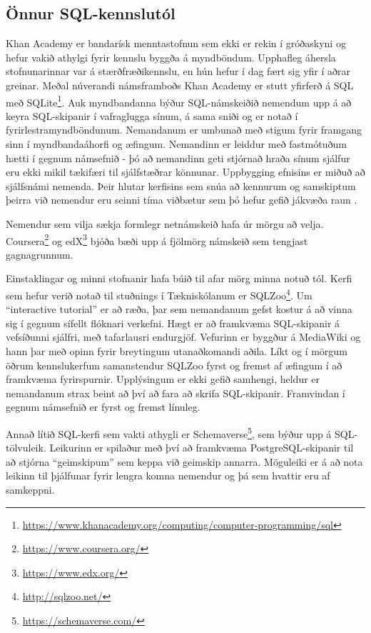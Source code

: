 \documentclass[a4paper,12pt,twoside,BCOR=10mm]{scrbook}
\begin{document}
\subsection{Önnur SQL-kennslutól}
\label{sec:other-sql-teaching-tools}
Khan Academy er bandarísk menntastofnun sem ekki er rekin í gróðaskyni og hefur vakið athylgi fyrir kennslu byggða á myndböndum. Upphafleg áhersla stofnunarinnar var á stærðfræðikennslu, en hún hefur í dag fært sig yfir í aðrar greinar. Meðal núverandi námsframboðs Khan Academy er stutt yfirferð á SQL með SQLite\footnote{\url{https://www.khanacademy.org/computing/computer-programming/sql}}. Auk myndbandanna býður SQL-námskeiðið nemendum upp á að keyra SQL-skipanir í vafraglugga sínum, á sama sniði og er notað í fyrirlestramyndböndunum. Nemandanum er umbunað með stigum fyrir framgang sinn í myndbandaáhorfi og æfingum. Nemandinn er leiddur með fastmótuðum hætti í gegnum námsefnið - þó að nemandinn geti stjórnað hraða sínum sjálfur eru ekki mikil tækifæri til sjálfstæðrar könnunar. Uppbygging efnisins er miðuð að sjálfsnámi nemenda. Þeir hlutar kerfisins sem snúa að kennurum og samskiptum þeirra við nemendur eru seinni tíma viðbætur sem þó hefur gefið jákvæða raun \cite{murphy2014research}.

Nemendur sem vilja sækja formlegr netnámskeið hafa úr mörgu að velja. Coursera\footnote{\url{https://www.coursera.org/}} og edX\footnote{\url{https://www.edx.org/}} bjóða bæði upp á fjölmörg námskeið sem tengjast gagnagrunnum.

Einstaklingar og minni stofnanir hafa búið til afar mörg minna notuð tól. Kerfi sem hefur verið notað til stuðnings í Tækniskólanum er SQLZoo\footnote{\url{http://sqlzoo.net/}}. Um ``interactive tutorial'' er að ræða, þar sem nemandanum gefst kostur á að vinna sig í gegnum sífellt flóknari verkefni. Hægt er að framkvæma SQL-skipanir á vefsíðunni sjálfri, með tafarlausri endurgjöf. Vefurinn er byggður á MediaWiki og hann þar með opinn fyrir breytingum utanaðkomandi aðila.
Líkt og í mörgum öðrum kennslukerfum samanstendur SQLZoo fyrst og fremst af æfingum í að framkvæma fyrirspurnir. Upplýsingum er ekki gefið samhengi, heldur er nemandanum strax beint að því að fara að skrifa SQL-skipanir. Framvindan í gegnum námsefnið er fyrst og fremst línuleg.

Annað lítið SQL-kerfi sem vakti athygli er Schemaverse\footnote{\url{https://schemaverse.com/}}, sem býður upp á SQL-tölvuleik. Leikurinn er spilaður með því að framkvæma PostgreSQL-skipanir til að stjórna ``geimskipum'' sem keppa við geimskip annarra. Möguleiki er á að nota leikinn til þjálfunar fyrir lengra komna nemendur og þá sem hvattir eru af samkeppni.
\end{document}
